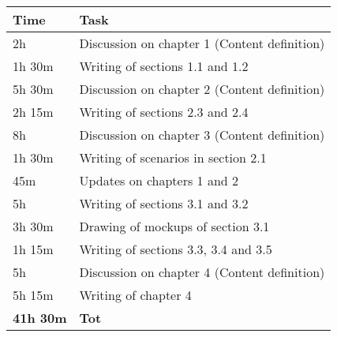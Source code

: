 \begin{center}
    {\renewcommand{\arraystretch}{2}%
    \begin{tabular}{L{2cm}L{12cm}}
        \hline
        \textbf{Time} & \textbf{Task} \\
        \hline
        2h & Discussion on chapter 1 (Content definition) \\
        \hline
        1h 30m & Writing of sections 1.1 and 1.2 \\
        \hline
        5h 30m & Discussion on chapter 2 (Content definition) \\
        \hline
        2h 15m & Writing of sections 2.3 and 2.4 \\
        \hline
        8h & Discussion on chapter 3 (Content definition) \\
        \hline
        1h 30m & Writing of scenarios in section 2.1 \\
        \hline
        45m & Updates on chapters 1 and 2 \\
        \hline
        5h & Writing of sections 3.1 and 3.2 \\
        \hline
        3h 30m & Drawing of mockups of section 3.1 \\
        \hline
        1h 15m & Writing of sections 3.3, 3.4 and 3.5 \\
        \hline
        5h & Discussion on chapter 4 (Content definition) \\
        \hline
        5h 15m & Writing of chapter 4 \\
        \hline
        \textbf{41h 30m} & \textbf{Tot} \\
    \end{tabular}}
\end{center}